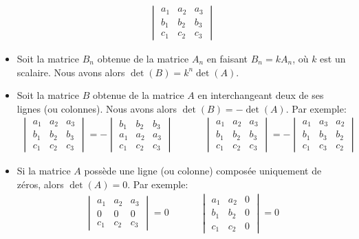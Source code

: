 \documentclass[]{book}
\theoremstyle{definition}
\theoremstyle{definition}
\theoremstyle{definition}
\theoremstyle{remark}
\begin{document}
\begin{itemize}
\begin{align*}
\begin{vmatrix}
  a_1 & a_2 & a_3 \\
  b_1 & b_2 & b_3 \\
  c_1 & c_2 & c_3
  \end{vmatrix}
  \end{align*}
\item
  Soit la matrice \(B_n\) obtenue de la matrice \(A_n\) en faisant \(B_n=kA_n\), où \(k\) est un scalaire. Nous avons alors \(\det(B)=k^n\det(A)\).
\item
  Soit la matrice \(B\) obtenue de la matrice \(A\) en interchangeant deux de ses lignes (ou colonnes). Nous avons alors \(\det(B)=-\det(A)\). Par exemple:
  \begin{align*}
  \begin{vmatrix}
  a_1 & a_2 & a_3 \\
  b_1 & b_2 & b_3 \\
  c_1 & c_2 & c_3
  \end{vmatrix}
  =
  -\begin{vmatrix}
  b_1 & b_2 & b_3 \\
  a_1 & a_2 & a_3 \\
  c_1 & c_2 & c_3
  \end{vmatrix}
  &
  \phantom{aaa}
  &
  \begin{vmatrix}
  a_1 & a_2 & a_3 \\
  b_1 & b_2 & b_3 \\
  c_1 & c_2 & c_3
  \end{vmatrix}
  =
  -\begin{vmatrix}
  a_1 & a_3 & a_2 \\
  b_1 & b_3 & b_2 \\
  c_1 & c_3 & c_2
  \end{vmatrix}
  \end{align*}
\item
  Si la matrice \(A\) possède une ligne (ou colonne) composée uniquement de zéros, alors \(\det(A)=0\). Par exemple:
  \begin{align*}
  \begin{vmatrix}
  a_1 & a_2 & a_3 \\
  0 & 0 & 0 \\
  c_1 & c_2 & c_3
  \end{vmatrix}
  =
  0
  &
  \phantom{aaa}
  &
  \begin{vmatrix}
  a_1 & a_2 & 0 \\
  b_1 & b_2 & 0 \\
  c_1 & c_2 & 0
  \end{vmatrix}
  =0
  \end{align*}

\end{itemize}
\end{document}
